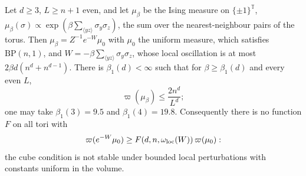 \begin{proposition}\label{prop:rSising}
Let $d\ge3$, $L\ge n+1$ even, and let $\mu_\beta$ be the Ising measure on
$\{\pm1\}^{\mathbb T}$, $\mu_\beta(\sigma)\propto\exp(\beta\sum_{\langle yz
\rangle}\sigma_y\sigma_z)$, the sum over the nearest-neighbour pairs of the
torus. Then $\mu_\beta=Z^{-1}e^{-W}\mu_0$ with $\mu_0$ the uniform measure,
which satisfies $\mathrm{BP}(n,1)$, and $W=-\beta\sum_{\langle yz\rangle}
\sigma_y\sigma_z$, whose local oscillation is at most $2\beta d(n^d+n^{d-1})$.
There is $\beta_1(d)<\infty$ such that for $\beta\ge\beta_1(d)$ and every
even $L$,
\[
\varpi(\mu_\beta)\le\frac{2n^d}{L^d};
\]
one may take $\beta_1(3)=9.5$ and $\beta_1(4)=19.8$. Consequently there is no
function $F$ on all tori with
\[
\varpi(e^{-W}\mu_0)\ge F(d,n,\omega_{\rm loc}(W))\,\varpi(\mu_0):
\]
the cube condition is not stable under bounded local
perturbations with constants uniform in the volume.
\end{proposition}

